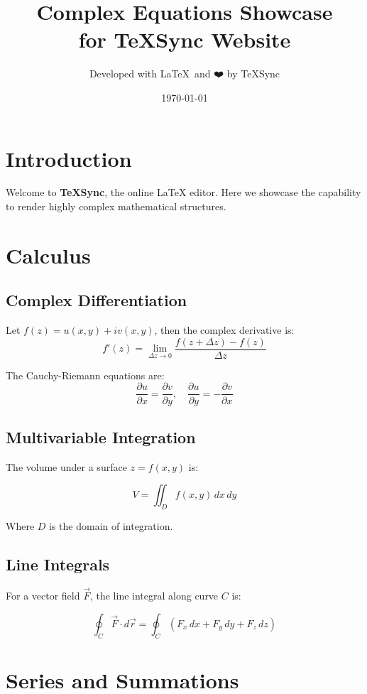 \documentclass{article}
\title{\textbf{Complex Equations Showcase \\ for TeXSync Website}}
\author{Developed with \LaTeX\ and ❤️ by TeXSync}
\date{\today}
\begin{document}
\maketitle

\tableofcontents
\newpage

\section{Introduction}

Welcome to \textbf{TeXSync}, the online LaTeX editor.  
Here we showcase the capability to render highly complex mathematical structures.

\section{Calculus}

\subsection{Complex Differentiation}

Let \( f(z) = u(x, y) + i v(x, y) \), then the complex derivative is:
\[
f'(z) = \lim_{\Delta z \to 0} \frac{f(z + \Delta z) - f(z)}{\Delta z}
\]

The Cauchy-Riemann equations are:
\[
\frac{\partial u}{\partial x} = \frac{\partial v}{\partial y}, \quad \frac{\partial u}{\partial y} = -\frac{\partial v}{\partial x}
\]

\subsection{Multivariable Integration}

The volume under a surface \( z = f(x,y) \) is:

\[
V = \iint_D f(x,y) \, dx\, dy
\]

Where \( D \) is the domain of integration.

\subsection{Line Integrals}

For a vector field \( \vec{F} \), the line integral along curve \( C \) is:

\[
\oint_C \vec{F} \cdot d\vec{r} = \oint_C \left( F_x \, dx + F_y \, dy + F_z \, dz \right)
\]

\section{Series and Summations}
\end{document}
